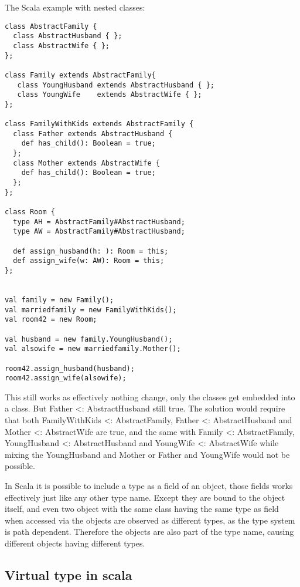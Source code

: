\documentclass[a4paper, 10pt, conference ]{llncs}
\begin{document}
The Scala example with nested classes:
\begin{verbatim}
class AbstractFamily {
  class AbstractHusband { };
  class AbstractWife { };
};

class Family extends AbstractFamily{
   class YoungHusband extends AbstractHusband { };
   class YoungWife    extends AbstractWife { };
};

class FamilyWithKids extends AbstractFamily {
  class Father extends AbstractHusband {
    def has_child(): Boolean = true;
  };
  class Mother extends AbstractWife {
    def has_child(): Boolean = true;
  };
};

class Room {
  type AH = AbstractFamily#AbstractHusband;
  type AW = AbstractFamily#AbstractHusband;

  def assign_husband(h: ): Room = this;
  def assign_wife(w: AW): Room = this;
};


val family = new Family();
val marriedfamily = new FamilyWithKids();
val room42 = new Room;

val husband = new family.YoungHusband();
val alsowife = new marriedfamily.Mother();

room42.assign_husband(husband);
room42.assign_wife(alsowife);
\end{verbatim}

This still works as effectively nothing change, only the classes get embedded into a class. But Father <: AbstractHusband still true.
The solution would require that both FamilyWithKids <: AbstractFamily, Father <: AbstractHusband and Mother <: AbstractWife are true, and the same with Family <: AbstractFamily, YoungHusband <: AbstractHusband and YoungWife <: AbstractWife while mixing the YoungHusband and Mother or Father and YoungWife would not be possible.

In Scala it is possible to include a type as a field of an object, those fields works effectively just like any other type name. Except they are bound to the object itself, and even two object with the same class having the same type as field when accessed via the objects are observed as different types, as the type system is path dependent. Therefore the objects are also part of the type name, causing different objects having different types.

\subsection{Virtual type in scala}
\end{document}
